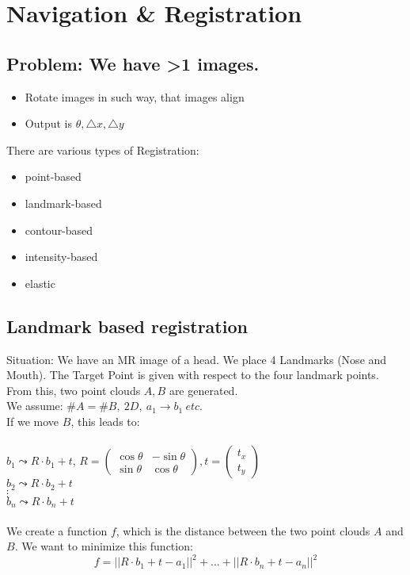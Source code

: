 \documentclass{exerciseBlue}
\begin{document}
  \section{Navigation \& Registration}
  \subsection{Problem: We have >1 images.}
  \begin{itemize}
  	\item Rotate images in such way, that images align
  	\item Output is $\theta, \triangle x, \triangle y$
    \end{itemize}
There are various types of Registration:
\begin{itemize}
	\item point-based
	\item landmark-based
	\item contour-based
	\item intensity-based
	\item elastic
\end{itemize}
\subsection{Landmark based registration}
Situation: We have an MR image of a head. We place 4 Landmarks (Nose and Mouth). The Target Point is given with respect to the four landmark points. \\
From this, two point clouds $A,B$ are generated.\\
We assume: $\#A = \#B, \ 2D, \ a_1\rightarrow b_1 \ etc.$\\
If we move $B$, this leads to:\\\\
$b_1 \leadsto R\cdot b_1 + t$, $R = \begin{pmatrix}
	\cos \theta & -\sin\theta\\
	\sin\theta & \cos\theta
\end{pmatrix}, t = \begin{pmatrix}
t_x\\
t_y
\end{pmatrix}$\\
$b_2 \leadsto R\cdot b_2 + t$\\
$\vdots$\\
$b_n \leadsto R\cdot b_n + t$\\\\
We create a function $f$, which is the distance between the two point clouds $A$ and $B$. We want to minimize this function:
$$f = ||R\cdot b_1 + t - a_1||^2+\dots+||R\cdot b_n + t - a_n||^2$$
\end{document}
